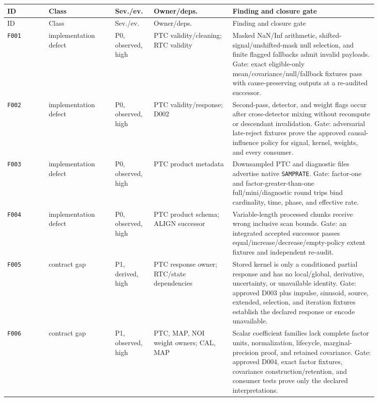 \documentclass[11pt]{article}
\newcommand{\code}[1]{\nolinkurl{#1}}
\begin{document}
\begin{longtable}{L{0.10\linewidth}L{0.165\linewidth}L{0.09\linewidth}L{0.19\linewidth}L{0.35\linewidth}}
\toprule
ID & Class & Sev./ev. & Owner/deps. & Finding and closure gate\\
\midrule
\endfirsthead
\toprule
ID & Class & Sev./ev. & Owner/deps. & Finding and closure gate\\
\midrule
\endhead
\code{F001} & implementation defect & P0, observed, high &
PTC validity/cleaning; RTC validity &
Masked NaN/Inf arithmetic, shifted-signal/unshifted-mask null selection, and
finite flagged fallbacks admit invalid payloads.  Gate: exact eligible-only
mean/covariance/null/fallback fixtures pass with cause-preserving outputs at a
re-audited successor.\\
\code{F002} & implementation defect & P0, observed, high &
PTC validity/response; D002 &
Second-pass, detector, and weight flags occur after cross-detector mixing
without recompute or descendant invalidation.  Gate: adversarial late-reject
fixtures prove the approved causal-influence policy for signal, kernel,
weights, and every consumer.\\
\code{F003} & implementation defect & P0, observed, high &
PTC product metadata &
Downsampled PTC and diagnostic files advertise native \code{SAMPRATE}.
Gate: factor-one and factor-greater-than-one full/mini/diagnostic round trips
bind cardinality, time, phase, and effective rate.\\
\code{F004} & implementation defect & P0, observed, high &
PTC product schema; ALIGN successor &
Variable-length processed chunks receive wrong inclusive scan bounds.  Gate:
an integrated accepted successor passes equal/increase/decrease/empty-policy
extent fixtures and independent re-audit.\\
\code{F005} & contract gap & P1, derived, high &
PTC response owner; RTC/state dependencies &
Stored kernel is only a conditioned partial response and has no local/global,
derivative, uncertainty, or unavailable identity.  Gate: approved D003 plus
impulse, sinusoid, source, extended, selection, and iteration fixtures establish the
declared response or encode unavailable.\\
\code{F006} & contract gap & P1, observed, high &
PTC, MAP, NOI weight owners; CAL, MAP &
Scalar coefficient families lack complete factor units, normalization,
lifecycle, marginal-precision proof, and retained covariance.  Gate: approved
D004, exact factor fixtures, covariance construction/retention, and consumer
tests prove only the declared interpretations.\\

\end{longtable}
\end{document}

